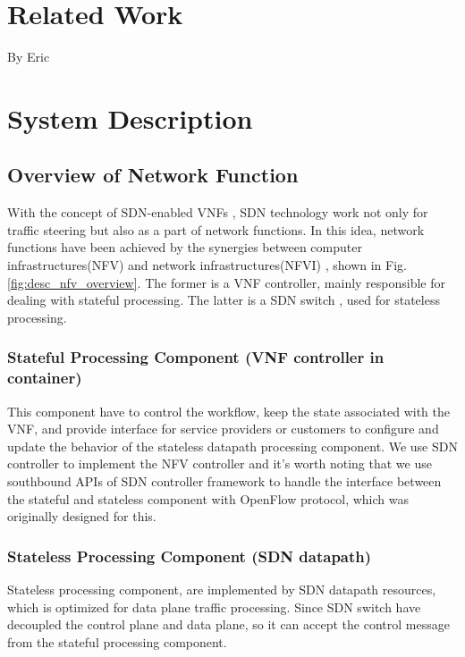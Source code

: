 \documentclass[journal]{IEEEtran}
\begin{document}
\section{Related Work}
By Eric





\section{System Description}
\subsection{Overview of Network Function}\label{ssec:desc_nfv_overview}
With the concept of SDN-enabled VNFs \cite{sdn-enabled} \cite{manage-nve}, SDN technology work not only for traffic steering but also as a part of network functions. In this idea, network functions have been achieved by the synergies between computer infrastructures(NFV) and network infrastructures(NFVI) \cite{nfv2014-v121}\cite{nfv2014-v111}\cite{nfv2015}, shown in Fig. \ref{fig:desc_nfv_overview}. The former is a VNF controller, mainly responsible for dealing with stateful processing. The latter is a SDN switch \cite{sp:openflow1.3}, used for stateless processing.

\subsubsection{Stateful Processing Component (VNF controller in container)}
This component have to control the workflow, keep the state associated with the VNF, and provide interface for service providers or customers to configure and update the behavior of the stateless datapath processing component. We use SDN controller to implement the NFV controller and it’s worth noting that we use southbound APIs of SDN controller framework to handle the interface between the stateful and stateless component with OpenFlow protocol, which was originally designed for this.

\subsubsection{Stateless Processing Component (SDN datapath)}
Stateless processing component, are implemented by SDN datapath resources, which is optimized for data plane traffic processing. Since SDN switch have decoupled the control plane and data plane, so it can accept the control message from the stateful processing component.
\end{document}
